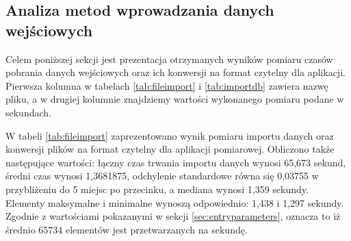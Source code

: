 \subsection{Analiza metod wprowadzania danych wejściowych}
\label{ssec:entrydata}
Celem poniższej sekcji jest prezentacja otrzymanych wyników pomiaru czasów pobrania danych wejściowych oraz ich konwersji na format czytelny dla aplikacji. Pierwsza kolumna w tabelach \ref{tab:fileimport} i \ref{tab:importdb} zawiera nazwę pliku, a w drugiej kolumnie znajdziemy wartości wykonanego pomiaru podane w sekundach.\par
W tabeli \ref{tab:fileimport} zaprezentowano wynik pomiaru importu danych oraz konwersji plików na format czytelny dla aplikacji pomiarowej. Obliczono także następujące wartości: łączny czas trwania importu danych wynosi 65,673 sekund, średni czas wynosi 1,3681875, odchylenie standardowe równa się 0,03755 w przybliżeniu do 5 miejsc po przecinku, a mediana wynosi 1,359 sekundy. Elementy maksymalne i minimalne wynoszą odpowiednio: 1,438 i
1,297 sekundy. Zgodnie z wartościami pokazanymi w sekcji \ref{sec:entryparameters}, oznacza to iż średnio 65734 elementów jest przetwarzanych na sekundę.
